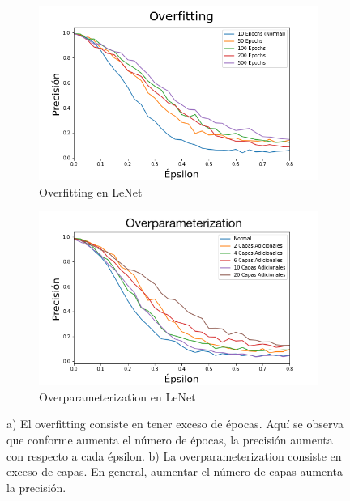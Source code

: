 \begin{figure}[h!]
    \centering
    \begin{subfigure}[b]{0.49\textwidth}
        \centering
        \includegraphics[width=\textwidth]{images/overfit_vs_attack.png}
        \caption{Overfitting en LeNet}
        \label{overfit}
    \end{subfigure}
    \begin{subfigure}[b]{0.49\textwidth}
        \centering
        \includegraphics[width=\textwidth]{images/overparam_vs_attack.png}
        \caption{Overparameterization en LeNet}
        \label{overparam}
    \end{subfigure}
    \caption{a) El overfitting consiste en tener exceso de épocas. Aquí se observa que conforme aumenta el número de épocas, la precisión aumenta con respecto a cada épsilon. b) La overparameterization consiste en exceso de capas. En general, aumentar el número de capas aumenta la precisión.}
    \label{overaparam_overfit}
\end{figure}

